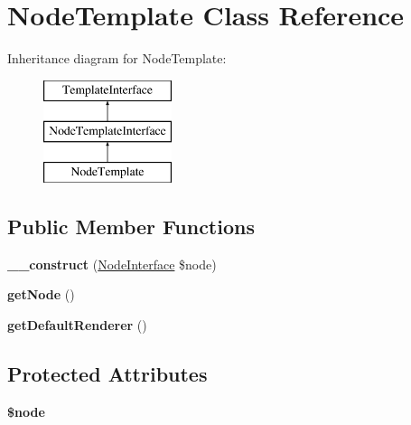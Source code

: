 \hypertarget{class_pes_1_1_view_1_1_template_1_1_node_template}{}\section{Node\+Template Class Reference}
\label{class_pes_1_1_view_1_1_template_1_1_node_template}
Inheritance diagram for Node\+Template\+:\begin{figure}[H]
\begin{center}
\leavevmode
\includegraphics[height=3.000000cm]{class_pes_1_1_view_1_1_template_1_1_node_template}
\end{center}
\end{figure}
\subsection*{Public Member Functions}
\begin{DoxyCompactItemize}
\item 
\mbox{\label{class_pes_1_1_view_1_1_template_1_1_node_template_a2de1e673b2093077e1b7d318bef71295}} 
{\bfseries \+\_\+\+\_\+construct} (\mbox{\hyperlink{interface_pes_1_1_dom_1_1_node_1_1_node_interface}{Node\+Interface}} \$node)
\item 
\mbox{\label{class_pes_1_1_view_1_1_template_1_1_node_template_a3a0d17930cbcc57bef84064afcc1a837}} 
{\bfseries get\+Node} ()
\item 
\mbox{\label{class_pes_1_1_view_1_1_template_1_1_node_template_a5f55a7569860e76380abf2728abc56d5}} 
{\bfseries get\+Default\+Renderer} ()
\end{DoxyCompactItemize}
\subsection*{Protected Attributes}
\begin{DoxyCompactItemize}
\item 
\mbox{\label{class_pes_1_1_view_1_1_template_1_1_node_template_a15955933e72700564e1a76d7f97c1ac7}} 
{\bfseries \$node}
\end{DoxyCompactItemize}


